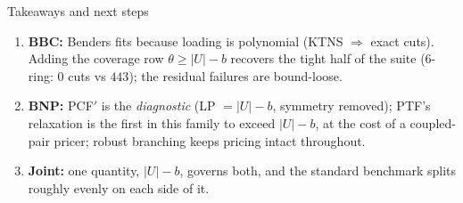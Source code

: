 \documentclass[10pt]{beamer}
\newcommand{\U}{U}\newcommand{\Kst}{K^{\ast}}\newcommand{\Zst}{Z^{\ast}}
\newcommand{\cov}{\lvert\U\rvert-b}
\begin{document}
\begin{frame}{Takeaways and next steps}
\begin{enumerate}
  \item \textbf{BBC:} Benders fits because loading is polynomial (KTNS $\Rightarrow$ exact
        cuts). Adding the coverage row $\theta\ge\cov$ recovers the tight half of the
        suite ($6$-ring: $0$ cuts vs $443$); the residual failures are bound-loose.
  \item \textbf{BNP:} PCF$'$ is the \emph{diagnostic} (LP $=\cov$, symmetry removed); PTF's
        relaxation is the first in this family to exceed $\cov$, at the cost of a
        coupled-pair pricer; robust branching keeps pricing intact throughout.
  \item \textbf{Joint:} one quantity, $\cov$, governs both, and the standard benchmark
        splits roughly evenly on each side of it.
\end{enumerate}
\end{frame}

\end{document}
